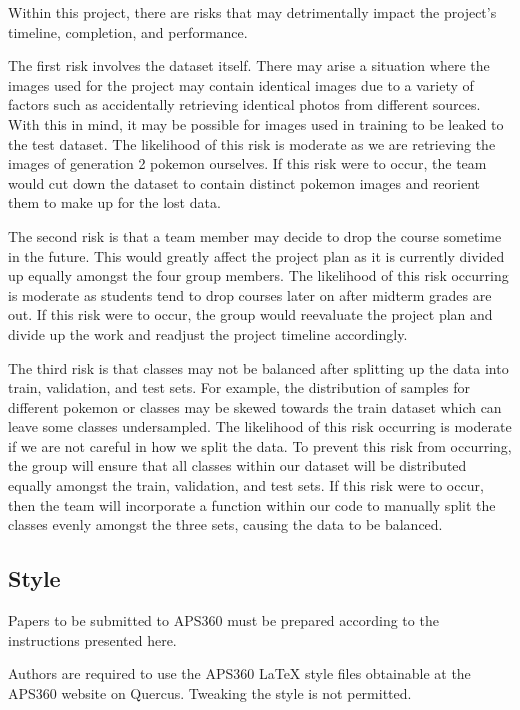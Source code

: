 \documentclass{article} %
\begin{document}
Within this project, there are risks that may detrimentally impact the project’s timeline, 
completion, and performance. 

The first risk involves the dataset itself. There may arise a situation where the images used for the project may contain identical images due to a variety of factors such as accidentally retrieving identical photos from different sources. With this in mind, it may be possible for images used in training to be leaked to the test dataset. The likelihood of this risk is moderate as we are retrieving the images of generation 2 pokemon ourselves. If this risk were to occur, the team would cut down the dataset to contain distinct pokemon images and reorient them to make up for the lost data.

The second risk is that a team member may decide to drop the course sometime in the future. This would greatly affect the project plan as it is currently divided up equally amongst the four group members. The likelihood of this risk occurring is moderate as students tend to drop courses later on after midterm grades are out. If this risk were to occur, the group would reevaluate the project plan and divide up the work and readjust the project timeline accordingly. 

The third risk is that classes may not be balanced after splitting up the data into train, validation, and test sets. For example, the distribution of samples for different pokemon or classes may be skewed towards the train dataset which can leave some classes undersampled. The likelihood of this risk occurring is moderate if we are not careful in how we split the data. To prevent this risk from occurring, the group will ensure that all classes within our dataset will be distributed equally amongst the train, validation, and test sets. If this risk were to occur, then the team will incorporate a function within our code to manually split the classes evenly amongst the three sets, causing the data to be balanced. 

\subsection{Style}

Papers to be submitted to APS360 must be prepared according to the
instructions presented here.

Authors are required to use the APS360 \LaTeX{} style files obtainable at the
APS360 website on Quercus. Tweaking the style is not permitted.
\end{document}
